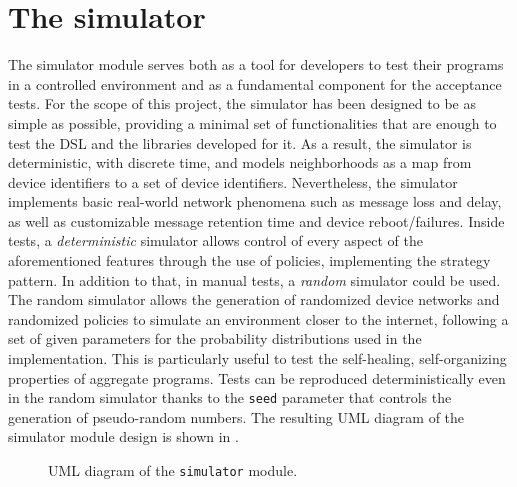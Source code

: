 \section{The simulator}

The simulator module serves both as a tool for developers to test their programs in a controlled environment and as a fundamental component for the acceptance tests.
%
For the scope of this project, the simulator has been designed to be as simple as possible, providing a minimal set of functionalities that are enough to test the \ac{DSL} and the libraries developed for it.
%
As a result, the simulator is deterministic, with discrete time, and models neighborhoods as a map from device identifiers to a set of device identifiers.
%
Nevertheless, the simulator implements basic real-world network phenomena such as message loss and delay, as well as customizable message retention time and device reboot/failures.
%
Inside tests, a \textit{deterministic} simulator allows control of every aspect of the aforementioned features through the use of policies, implementing the strategy pattern.
%
In addition to that, in manual tests, a \textit{random} simulator could be used.
%
The random simulator allows the generation of randomized device networks and randomized policies to simulate an environment closer to the internet, following a set of given parameters for the probability distributions used in the implementation.
%
This is particularly useful to test the self-healing, self-organizing properties of aggregate programs.
%
Tests can be reproduced deterministically even in the random simulator thanks to the \texttt{seed} parameter that controls the generation of pseudo-random numbers.
%
The resulting \ac{UML} diagram of the simulator module design is shown in .

\begin{figure}
    \centering
    \caption{\ac{UML} diagram of the \texttt{simulator} module.}
    \label{fig:simulator-uml}
    \bigskip
    \resizebox{\linewidth}{!}{
        
    }
\end{figure}

